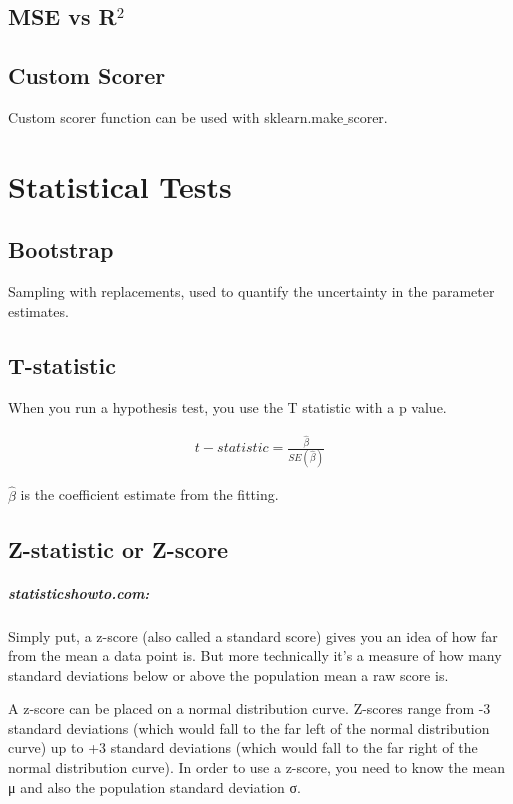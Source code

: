 \documentclass[a4paper, 12pt]{report}
\begin{document}
\section{MSE vs R$^2$}

\section{Custom Scorer}
Custom scorer function can be used with sklearn.make$\_$scorer.
\chapter{Statistical Tests}

\section{Bootstrap}
Sampling with replacements, used to quantify the uncertainty in the parameter estimates.

\section{T-statistic}
When you run a hypothesis test, you use the T statistic with a p value. 

\begin{align}
	t-statistic = \frac{\hat{\beta}}{SE(\hat{\beta})}
\end{align}

$\hat{\beta}$ is the coefficient estimate from the fitting.

\section{Z-statistic or Z-score}
\paragraph{statisticshowto.com:} Simply put, a z-score (also called a standard score) gives you an idea of how far from the mean a data point is. But more technically it’s a measure of how many standard deviations below or above the population mean a raw score is.

A z-score can be placed on a normal distribution curve. Z-scores range from -3 standard deviations (which would fall to the far left of the normal distribution curve) up to +3 standard deviations (which would fall to the far right of the normal distribution curve). In order to use a z-score, you need to know the mean μ and also the population standard deviation σ.
\end{document}
